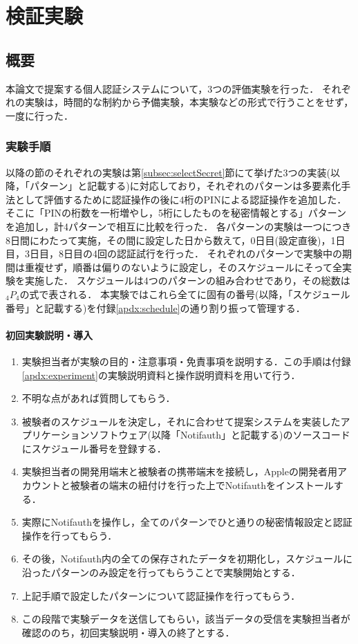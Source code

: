 \chapter{検証実験}\label{chap:experiment}

\section{概要}
本論文で提案する個人認証システムについて，3つの評価実験を行った．
それぞれの実験は，時間的な制約から予備実験，本実験などの形式で行うことをせず，一度に行った．

\subsection{実験手順}
以降の節のそれぞれの実験は第\ref{subsec:selectSecret}節にて挙げた3つの実装(以降，「パターン」と記載する)に対応しており，それぞれのパターンは多要素化手法として評価するために認証操作の後に4桁のPINによる認証操作を追加した．
そこに「PINの桁数を一桁増やし，5桁にしたものを秘密情報とする」パターンを追加し，計4パターンで相互に比較を行った．
各パターンの実験は一つにつき8日間にわたって実施，その間に設定した日から数えて，0日目(設定直後)，1日目，3日目，8日目の4回の認証試行を行った．
それぞれのパターンで実験中の期間は重複せず，順番は偏りのないように設定し，そのスケジュールにそって全実験を実施した．
スケジュールは4つのパターンの組み合わせであり，その総数は$ {}_4 P _4 $の式で表される．
本実験ではこれら全てに固有の番号(以降，「スケジュール番号」と記載する)を付録\ref{apdx:schedule}の通り割り振って管理する．

\subsubsection{初回実験説明・導入}
\begin{enumerate}
  \item 実験担当者が実験の目的・注意事項・免責事項を説明する．この手順は付録\ref{apdx:experiment}の実験説明資料と操作説明資料を用いて行う．
  \item 不明な点があれば質問してもらう．
  \item 被験者のスケジュールを決定し，それに合わせて提案システムを実装したアプリケーションソフトウェア(以降「Notifauth」と記載する)のソースコードにスケジュール番号を登録する．
  \item 実験担当者の開発用端末と被験者の携帯端末を接続し，Appleの開発者用アカウントと被験者の端末の紐付けを行った上でNotifauthをインストールする．
  \item 実際にNotifauthを操作し，全てのパターンでひと通りの秘密情報設定と認証操作を行ってもらう．
  \item その後，Notifauth内の全ての保存されたデータを初期化し，スケジュールに沿ったパターンのみ設定を行ってもらうことで実験開始とする．
  \item 上記手順で設定したパターンについて認証操作を行ってもらう．
  \item この段階で実験データを送信してもらい，該当データの受信を実験担当者が確認ののち，初回実験説明・導入の終了とする．
\end{enumerate}

